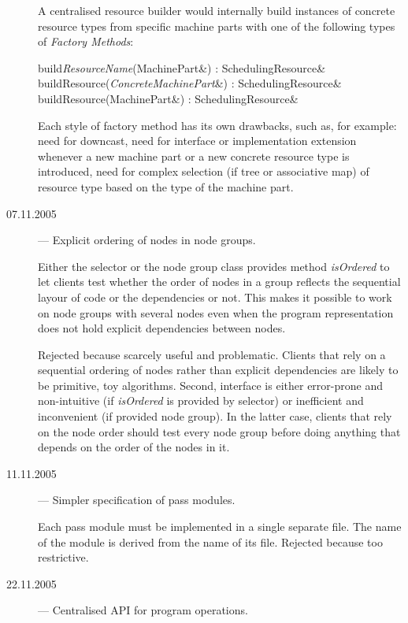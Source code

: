 \documentclass[a4paper,twoside]{tce}
\begin{document}
\begin{description}
  A centralised resource builder would internally build instances of
  concrete resource types from specific machine parts with one of the
  following types of \emph{Factory Methods}:
  \begin{description}
  \item[build\emph{ResourceName}(MachinePart\&) : SchedulingResource\&]%
  \item[buildResource(\emph{ConcreteMachinePart}\&) : SchedulingResource\&]%
  \item[buildResource(MachinePart\&) : SchedulingResource\&]%
  \end{description}
  Each style of factory method has its own drawbacks, such as, for example:
  need for downcast, need for interface or implementation extension whenever
  a new machine part or a new concrete resource type is introduced, need for
  complex selection (if tree or associative map) of resource type based on
  the type of the machine part.

\item[07.11.2005] --- Explicit ordering of nodes in node groups.

  Either the selector or the node group class provides method
  \emph{isOrdered} to let clients test whether the order of nodes in a group
  reflects the sequential layour of code or the dependencies or not. This
  makes it possible to work on node groups with several nodes even when the
  program representation does not hold explicit dependencies between nodes.

  Rejected because scarcely useful and problematic. Clients that rely on a
  sequential ordering of nodes rather than explicit dependencies are likely
  to be primitive, toy algorithms. Second, interface is either error-prone
  and non-intuitive (if \emph{isOrdered} is provided by selector) or
  inefficient and inconvenient (if provided node group). In the latter case,
  clients that rely on the node order should test every node group before
  doing anything that depends on the order of the nodes in it.

\item[11.11.2005] --- Simpler specification of pass modules.

  Each pass module must be implemented in a single separate file. The name
  of the module is derived from the name of its file. Rejected because too
  restrictive.

\item[22.11.2005] --- Centralised API for program operations.


\end{description}
\end{document}
